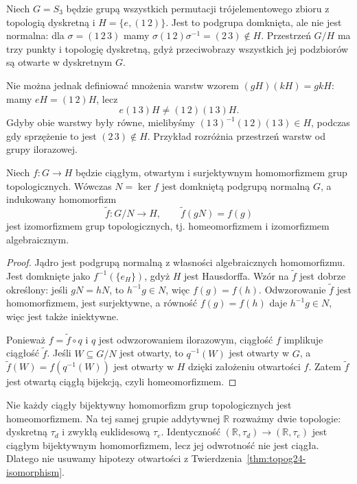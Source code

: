 \begin{przyklad}
\label{ex:topog24-nonnormal-s3}
Niech \(G=S_3\) będzie grupą wszystkich permutacji
trójelementowego zbioru z topologią dyskretną
i \(H=\{e,(1\,2)\}\).
Jest to podgrupa domknięta, ale nie jest normalna:
dla \(\sigma=(1\,2\,3)\) mamy
\(\sigma(1\,2)\sigma^{-1}=(2\,3)\notin H\).
Przestrzeń \(G/H\) ma trzy punkty i topologię dyskretną,
gdyż przeciwobrazy wszystkich jej podzbiorów
są otwarte w dyskretnym \(G\).

Nie można jednak definiować mnożenia warstw
wzorem \((gH)(kH)=gkH\):
mamy \(eH=(1\,2)H\), lecz
\[
 e(1\,3)H\neq(1\,2)(1\,3)H.
\]
Gdyby obie warstwy były równe, mielibyśmy
\((1\,3)^{-1}(1\,2)(1\,3)\in H\),
podczas gdy sprzężenie to jest \((2\,3)\notin H\).
Przykład rozróżnia przestrzeń warstw od grupy ilorazowej.
\end{przyklad}

\begin{twierdzenie}
\label{thm:topog24-isomorphism}
Niech \(f\colon G\to H\) będzie
ciągłym, otwartym i surjektywnym
homomorfizmem grup topologicznych.
Wówczas \(N=\ker f\) jest
domkniętą podgrupą normalną \(G\),
a indukowany homomorfizm
\[
 \widetilde f\colon G/N\to H,\qquad
 \widetilde f(gN)=f(g)
\]
jest izomorfizmem grup topologicznych,
tj. homeomorfizmem i izomorfizmem
algebraicznym.
\end{twierdzenie}
\begin{proof}
Jądro jest podgrupą normalną
z własności algebraicznych homomorfizmu.
Jest domknięte jako
\(f^{-1}(\{e_H\})\), gdyż \(H\)
jest Hausdorffa.
Wzór na \(\widetilde f\)
jest dobrze określony: jeśli \(gN=hN\),
to \(h^{-1}g\in N\), więc \(f(g)=f(h)\).
Odwzorowanie \(\widetilde f\)
jest homomorfizmem, jest surjektywne,
a równość \(f(g)=f(h)\) daje
\(h^{-1}g\in N\), więc jest także iniektywne.

Ponieważ \(f=\widetilde f\circ q\)
i \(q\) jest odwzorowaniem ilorazowym,
ciągłość \(f\) implikuje ciągłość
\(\widetilde f\).
Jeśli \(W\subseteq G/N\) jest otwarty,
to \(q^{-1}(W)\) jest otwarty w \(G\),
a
\(\widetilde f(W)=f(q^{-1}(W))\)
jest otwarty w \(H\)
dzięki założeniu otwartości \(f\).
Zatem \(\widetilde f\) jest otwartą
ciągłą bijekcją, czyli homeomorfizmem.
\end{proof}

\begin{uwaga}
\label{rem:topog24-nonopen-map}
Nie każdy ciągły bijektywny
homomorfizm grup topologicznych
jest homeomorfizmem.
Na tej samej grupie addytywnej
\(\mathbb R\) rozważmy dwie topologie:
dyskretną \(\tau_d\)
i zwykłą euklidesową \(\tau_e\).
Identyczność
\((\mathbb R,\tau_d)\to(\mathbb R,\tau_e)\)
jest ciągłym bijektywnym homomorfizmem,
lecz jej odwrotność nie jest ciągła.
Dlatego nie usuwamy hipotezy
otwartości z
Twierdzenia~\ref{thm:topog24-isomorphism}.
\end{uwaga}

